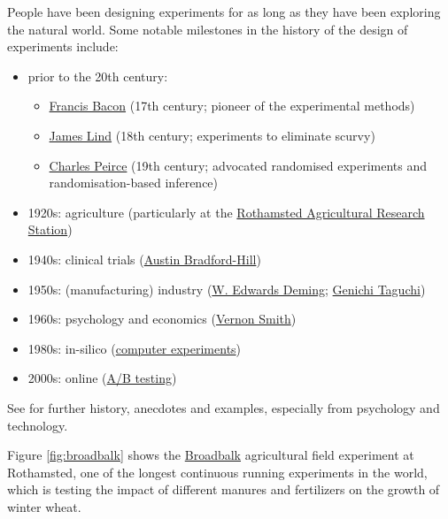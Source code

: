 \documentclass[
]{book}
\providecommand{\tightlist}{%
  \setlength{\itemsep}{0pt}\setlength{\parskip}{0pt}}
\theoremstyle{definition}
\theoremstyle{definition}
\theoremstyle{definition}
\theoremstyle{definition}
\theoremstyle{remark}
\begin{document}
People have been designing experiments for as long as they have been exploring the natural world. Some notable milestones in the history of the design of experiments include:

\begin{itemize}
\tightlist
\item
  prior to the 20th century:

  \begin{itemize}
  \tightlist
  \item
    \href{https://en.wikipedia.org/wiki/Baconian_method}{Francis Bacon} (17th century; pioneer of the experimental methods)
  \item
    \href{https://en.wikipedia.org/wiki/James_Lind}{James Lind} (18th century; experiments to eliminate scurvy)
  \item
    \href{https://en.wikipedia.org/wiki/Charles_Sanders_Peirce\#Probability_and_statistics}{Charles Peirce} (19th century; advocated randomised experiments and randomisation-based inference)
  \end{itemize}
\item
  1920s: agriculture (particularly at the \href{https://www.rothamsted.ac.uk/history-and-heritage}{Rothamsted Agricultural Research Station})
\item
  1940s: clinical trials (\href{https://en.wikipedia.org/wiki/Austin_Bradford_Hill}{Austin Bradford-Hill})
\item
  1950s: (manufacturing) industry (\href{https://en.wikipedia.org/wiki/W._Edwards_Deming}{W. Edwards Deming}; \href{https://en.wikipedia.org/wiki/Genichi_Taguchi}{Genichi Taguchi})
\item
  1960s: psychology and economics (\href{https://en.wikipedia.org/wiki/Vernon_L._Smith}{Vernon Smith})
\item
  1980s: in-silico (\href{https://en.wikipedia.org/wiki/Computer_experiment}{computer experiments})
\item
  2000s: online (\href{https://en.wikipedia.org/wiki/A/B_testing}{A/B testing})
\end{itemize}

See \citet{LB2020} for further history, anecdotes and examples, especially from psychology and technology.

Figure \ref{fig:broadbalk} shows the \href{http://www.era.rothamsted.ac.uk/Broadbalk}{Broadbalk} agricultural field experiment at Rothamsted, one of the longest continuous running experiments in the world, which is testing the impact of different manures and fertilizers on the growth of winter wheat.
\end{document}
